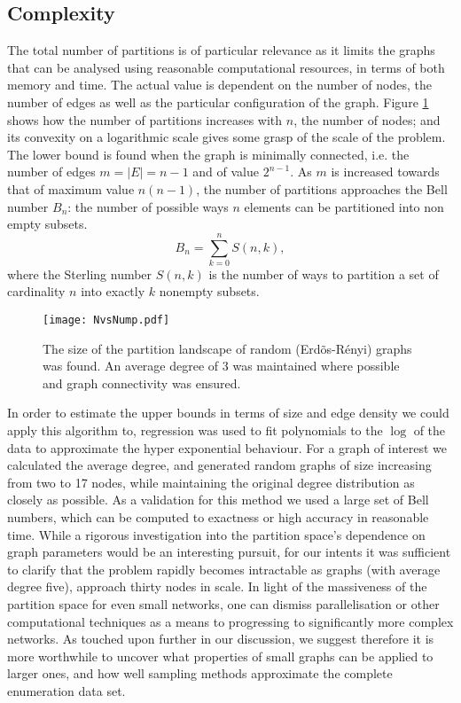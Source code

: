 \subsection*{Complexity}
The total number of partitions is of particular relevance as it limits the graphs that can be analysed using reasonable computational resources, in terms of both memory and time.  The actual value is dependent on the number of nodes, the number of edges as well as
the particular configuration of the graph. Figure \ref{fig:ababa} shows how the number of partitions increases with $n$, the number of nodes; and its convexity on a logarithmic scale gives some grasp of the scale of the problem.  The lower bound is found when the graph is minimally connected, i.e. the number of edges $m = \vert E \vert = n - 1$ and of value $2^{n-1}$.  As $m$ is increased towards that of maximum value $n(n-1)$, the number of partitions approaches the Bell number $B_n$: the number of possible ways $n$ elements can be partitioned into non empty subsets.
\[ 
B_n = \sum_{k=0}^n S(n,k),
 \]
where the Sterling number $S(n,k)$ is the number of ways to partition a set of cardinality $n$ into exactly $k$ nonempty subsets.

\begin{figure}[h]
  \centering
  \label{fig:nodesVsparts} \texttt{[image: NvsNump.pdf]}
  \caption[Complexity as a function of $N$]%
  {The size of the partition landscape of random (Erd\~os-R\'{e}nyi) graphs was found.
  An average degree of 3 was maintained where possible and graph connectivity was ensured.  }\label{fig:ababa} 
\end{figure}

In order to estimate the upper bounds in terms of size and edge density we could apply this algorithm to, regression was used to fit polynomials to the $\log$ of the data to approximate the hyper exponential behaviour.  For a graph of interest we calculated the average degree, and generated random graphs of size increasing from two to 17 nodes, while maintaining the original degree distribution as closely as possible.  As a validation for this method we used a large set of Bell numbers, which can be computed to exactness or high accuracy in reasonable time.  While a rigorous investigation into the partition space's dependence on graph parameters would be an interesting pursuit, for our intents it was sufficient to clarify that the problem rapidly becomes intractable as graphs (with average degree five), approach thirty nodes in scale.  In light of the massiveness of the partition space for even small networks, one can dismiss parallelisation or other computational techniques as a means to progressing to significantly more complex networks.  As touched upon further in our discussion, we suggest therefore it is more worthwhile to uncover what properties of small graphs can be applied to larger ones, and how well sampling methods approximate the complete enumeration data set.


